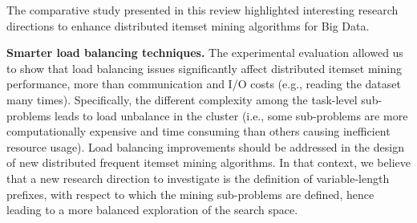 


The comparative study presented in this review highlighted interesting research directions to enhance distributed itemset mining algorithms for Big Data.


\textbf{Smarter load balancing techniques.} 
The experimental evaluation allowed us to show that load balancing issues significantly affect distributed itemset mining performance, more than communication and I/O costs (e.g., reading the dataset many times). 
Specifically, the different complexity among the task-level sub-problems leads to load unbalance in the cluster 
(i.e., some sub-problems are more computationally expensive and time consuming than others causing inefficient resource usage).
Load balancing improvements should be addressed in the design of new distributed frequent itemset mining algorithms. 
In that context, we believe that a new research direction to investigate is the definition of variable-length prefixes, 
with respect to which the mining sub-problems are defined, 
hence leading to a more balanced exploration of the search space. 

